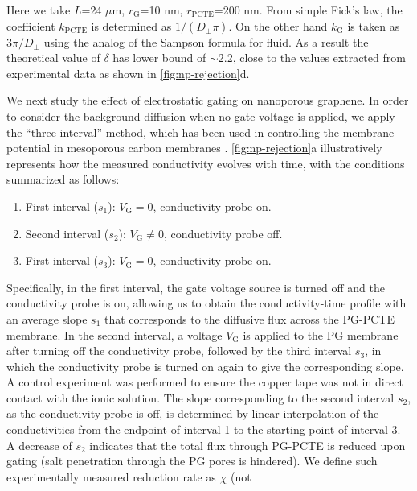 Here we take $L$=24 $\mu$m, $r_{\mathrm{G}}$=10 nm,
$r_{\mathrm{PCTE}}$=200 nm. From simple Fick's law, the coefficient
$k_{\mathrm{PCTE}}$ is determined as $1/(D_{\mathrm{\pm}} \pi)$. On
the other hand $k_{\mathrm{G}}$ is taken as $3 \pi / D_{\mathrm{\pm}}$
using the analog of the Sampson formula for
fluid\autocite{Roscoe_1949_sampson_formula}. As a result the theoretical
value of $\delta$ has lower bound of $\sim$2.2, close to the values
extracted from experimental data as shown in \autoref{fig:np-rejection}d.

  
We next study the effect of electrostatic gating on nanoporous graphene. 
In order to consider the background diffusion when no gate voltage is
applied, we apply the ``three-interval'' method, which has been used in
controlling the membrane potential in mesoporous carbon membranes
\autocite{Surwade_2014_carbon_electrochemical_ion}.
%
\autoref{fig:np-rejection}a illustratively represents how the measured
conductivity evolves with time, with the conditions summarized as
follows:
\begin{enumerate}
\item First interval ($s_{1}$): $V_{\mathrm{G}} = 0$, conductivity probe on.
  
\item Second interval ($s_{2}$): $V_{\mathrm{G}} \neq 0$, conductivity probe off.

  \item First interval ($s_{3}$): $V_{\mathrm{G}} = 0$, conductivity probe on.
\end{enumerate}
Specifically, in the first interval,
the gate voltage source is turned off and the conductivity probe is
on, allowing us to obtain the conductivity-time profile with an
average slope $s_{1}$ that corresponds to the diffusive flux across
the PG-PCTE membrane. In the second interval, a voltage
$V_{\mathrm{G}}$ is applied to the PG membrane after turning off the
conductivity probe, followed by the third interval $s_{3}$, in which
the conductivity probe is turned on again to give the corresponding
slope. A control experiment was performed to ensure the copper tape
was not in direct contact with the ionic solution.
%
The slope corresponding to the
second interval $s_{2}$, as the conductivity probe is off, is
determined by linear interpolation of the conductivities from the
endpoint of interval 1 to the starting point of interval 3. A decrease
of $s_{2}$ indicates that the total flux through
PG-PCTE is reduced upon gating (\ie salt penetration through the PG
pores is hindered).
%
We define such experimentally measured reduction rate as $\chi$ (not
